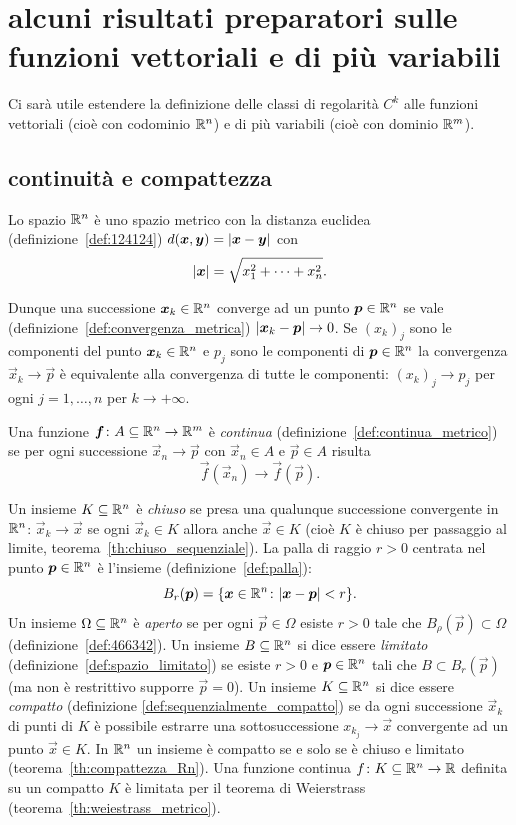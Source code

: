 \section[funzioni vettoriali e di più variabili]{alcuni risultati preparatori
sulle funzioni vettoriali e di più variabili}

Ci sarà utile estendere la definizione delle classi di regolarità $C^k$ alle
funzioni vettoriali (cioè con codominio ${\mathbb R}^n$) e di più variabili
(cioè con dominio ${\mathbb R}^m$).

\subsection{continuità e compattezza}

Lo spazio ${\mathbb R}^n$ è uno spazio metrico con la distanza euclidea 
(definizione~\ref{def:124124})
$d(\boldsymbol x, \boldsymbol y) = {\left|\boldsymbol x- \boldsymbol y\right|}$ con 
\[
 {\left|\boldsymbol x\right|} = \sqrt{x_1^2 + \dots + x_n^2}.  
\] 

Dunque una successione $\boldsymbol x_k\in {\mathbb R}^n$ converge 
ad un punto $\boldsymbol p\in {\mathbb R}^n$ se vale 
(definizione~\ref{def:convergenza_metrica}) 
${\left|\boldsymbol x_k - \boldsymbol p\right|}\to 0$.
Se $(x_k)_j$ sono le componenti del punto $\boldsymbol x_k\in {\mathbb R}^n$ e 
$p_j$ sono le componenti di $\boldsymbol p\in {\mathbb R}^n$ la convergenza 
$\vec x_k \to \vec p$ è equivalente alla convergenza di 
tutte le componenti: $(x_k)_j \to p_j$ per ogni $j=1,\dots,n$
per $k\to +\infty$.

Una funzione $\boldsymbol f\colon A \subseteq {\mathbb R}^n\to {\mathbb R}^m$ 
è \emph{continua} 
(definizione~\ref{def:continua_metrico})
se per ogni successione $\vec x_n \to \vec p$ con 
$\vec x_n\in A$ e $\vec p\in A$ risulta 
\[
  \vec f(\vec x_n) \to \vec f(\vec p).
\]

Un insieme $K\subseteq {\mathbb R}^n$ è \emph{chiuso}%
se presa una qualunque successione convergente in ${\mathbb R}^n$:
$\vec x_k \to \vec x$ se ogni $\vec x_k\in K$ allora anche 
$\vec x \in K$ (cioè $K$ è chiuso per passaggio al limite,
teorema~\ref{th:chiuso_sequenziale}).
La palla di raggio $r>0$ centrata nel punto $\boldsymbol p\in {\mathbb R}^n$ 
è l'insieme (definizione~\ref{def:palla}):
\[
  B_r(\boldsymbol p) = {\left\{ \boldsymbol x \in {\mathbb R}^n\colon {\left|\boldsymbol x - \boldsymbol p\right|}< r \right\}}.  
\]
Un insieme $\Omega\subseteq {\mathbb R}^n$ è \emph{aperto}
se per ogni $\vec p\in \Omega$ esiste $r>0$ tale che $B_\rho(\vec p) \subset \Omega$
(definizione~\ref{def:466342}).
Un insieme $B\subseteq {\mathbb R}^n$ si dice essere \emph{limitato}
(definizione~\ref{def:spazio_limitato})
se esiste $r>0$ e $\boldsymbol p\in{\mathbb R}^n$ tali che $B\subset B_r(\vec p)$ 
(ma non è restrittivo supporre $\vec p=0$).
Un insieme $K\subseteq {\mathbb R}^n$ si dice essere \emph{compatto} 
(definizione \ref{def:sequenzialmente_compatto}) se da ogni successione 
$\vec x_k$ di punti di $K$ è possibile estrarre una sottosuccessione $x_{k_j} \to \vec x$ 
convergente ad un punto $\vec x \in K$.
In ${\mathbb R}^n$ un insieme è compatto se e solo se è chiuso e limitato
(teorema~\ref{th:compattezza_Rn}).
Una funzione continua $f\colon K\subseteq {\mathbb R}^n\to{\mathbb R}$ definita
su un compatto $K$ è limitata per il teorema di Weierstrass (teorema~\ref{th:weiestrass_metrico}).


